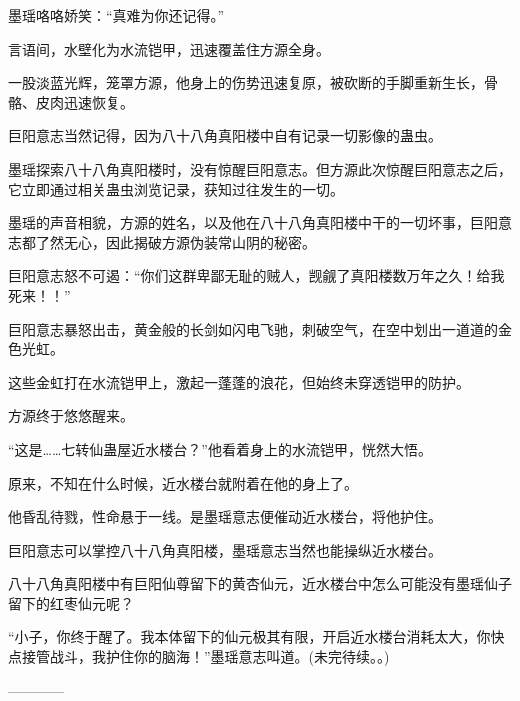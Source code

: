 \begin{this_body}
墨瑶咯咯娇笑：“真难为你还记得。”

言语间，水壁化为水流铠甲，迅速覆盖住方源全身。

一股淡蓝光辉，笼罩方源，他身上的伤势迅速复原，被砍断的手脚重新生长，骨骼、皮肉迅速恢复。

巨阳意志当然记得，因为八十八角真阳楼中自有记录一切影像的蛊虫。

墨瑶探索八十八角真阳楼时，没有惊醒巨阳意志。但方源此次惊醒巨阳意志之后，它立即通过相关蛊虫浏览记录，获知过往发生的一切。

墨瑶的声音相貌，方源的姓名，以及他在八十八角真阳楼中干的一切坏事，巨阳意志都了然无心，因此揭破方源伪装常山阴的秘密。

巨阳意志怒不可遏：“你们这群卑鄙无耻的贼人，觊觎了真阳楼数万年之久！给我死来！！”

巨阳意志暴怒出击，黄金般的长剑如闪电飞驰，刺破空气，在空中划出一道道的金色光虹。

这些金虹打在水流铠甲上，激起一蓬蓬的浪花，但始终未穿透铠甲的防护。

方源终于悠悠醒来。

“这是……七转仙蛊屋近水楼台？”他看着身上的水流铠甲，恍然大悟。

原来，不知在什么时候，近水楼台就附着在他的身上了。

他昏乱待戮，性命悬于一线。是墨瑶意志便催动近水楼台，将他护住。

巨阳意志可以掌控八十八角真阳楼，墨瑶意志当然也能操纵近水楼台。

八十八角真阳楼中有巨阳仙尊留下的黄杏仙元，近水楼台中怎么可能没有墨瑶仙子留下的红枣仙元呢？

“小子，你终于醒了。我本体留下的仙元极其有限，开启近水楼台消耗太大，你快点接管战斗，我护住你的脑海！”墨瑶意志叫道。(未完待续。。)

------------

\end{this_body}

